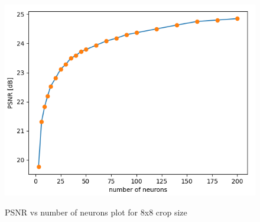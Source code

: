 \documentclass[../IDP_Task5_Karwowski_Kowalewski.tex]{subfiles}
\begin{document}
{    \begin{figure}[!htbp]
        \centering
        \includegraphics[width=\textwidth]{img/karwowski/8x8_number_of_neurons}
        \label{fig:8x8_number_of_neurons}
        \caption{PSNR vs number of neurons plot for 8x8 crop size}
    \end{figure}
    \FloatBarrier
}
\end{document}

